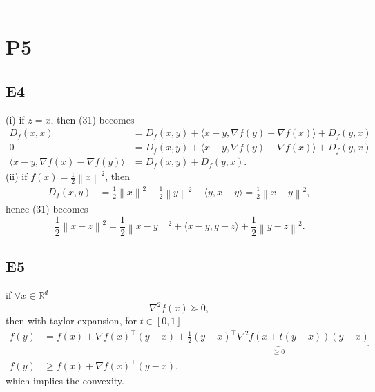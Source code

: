 \documentclass[12pt]{article}
\begin{document}
\hrule
\vspace{0.1cm}
\section*{P5}
\subsection*{E4}
(i) if $z = x$, then (31) becomes
\begin{equation*}
    \begin{split}
        D_f(x,x) &= D_f(x,y) + \langle x-y, \nabla f(y) - \nabla f(x)\rangle + D_f(y,x) \\
        0 &= D_f(x,y) + \langle x-y, \nabla f(y) - \nabla f(x)\rangle + D_f(y,x) \\
        \langle x-y, \nabla f(x) - \nabla f(y)\rangle &= D_f(x,y) + D_f(y,x).
    \end{split}
\end{equation*}
(ii) if $f(x) = \frac{1}{2}\left\| x\right\|^2$, then
\begin{equation*}
    \begin{split}
        D_f(x, y) &= \frac{1}{2}\left\| x\right\|^2 - \frac{1}{2}\left\| y \right\|^2 - \langle y, x-y \rangle = \frac{1}{2}\left\| x-y \right\|^2,
    \end{split}
\end{equation*}
hence (31) becomes
\begin{equation*}
    \frac{1}{2}\left\| x - z \right\|^2 = \frac{1}{2}\left\| x - y \right\|^2 + \langle x-y, y-z \rangle + \frac{1}{2}\left\| y - z \right\|^2.
\end{equation*}
\subsection*{E5}
if $\forall x \in \mathbb{R}^d$
\begin{equation*}
    \nabla^2 f(x) \succeq 0,
\end{equation*}
then with taylor expansion, for $t \in [0,1]$
\begin{equation*}
    \begin{split}
        f(y) &= f(x) + \nabla f(x)^\top(y-x) + \underbrace{\frac{1}{2}(y-x)^\top \nabla^2f(x+t(y-x))(y-x)}_{\geq 0} \\
        f(y) &\geq f(x) + \nabla f(x)^\top(y-x),
    \end{split}
\end{equation*}
which implies the convexity.
\vspace{0.1cm}
\end{document}
